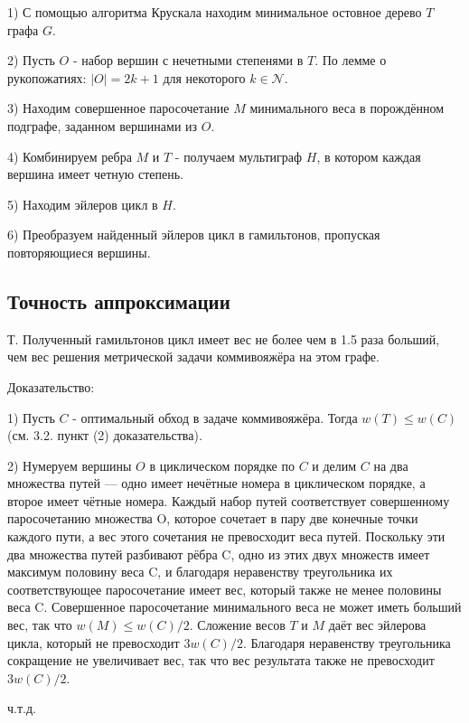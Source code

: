 \documentclass[a4paper,12pt]{article}
\begin{document}
1) С помощью алгоритма Крускала находим минимальное остовное дерево $T$ графа $G$.

2) Пусть $O$ - набор вершин с нечетными степенями в $T$. По лемме о рукопожатиях: $|O| = 2k + 1$ для некоторого $k \in \mathscr{N}$.

3) Находим совершенное паросочетание $M$ минимального веса в порождённом подграфе, заданном вершинами из $O$.

4) Комбинируем ребра $M$ и $T$ - получаем мультиграф $H$, в котором каждая вершина имеет четную степень.

5) Находим эйлеров цикл в $H$.

6) Преобразуем найденный эйлеров цикл в гамильтонов, пропуская повторяющиеся вершины.

\subsection{Точность аппроксимации}

Т. Полученный гамильтонов цикл имеет вес не более чем в 1.5 раза больший, чем вес решения метрической задачи коммивояжёра на этом графе.

Доказательство: 

1) Пусть $C$ - оптимальный обход в задаче коммивояжёра. Тогда $w(T) \leq w(C)$ (см. 3.2. пункт (2) доказательства).

2) Нумеруем вершины $O$ в циклическом порядке по $C$ и делим  $C$ на два множества путей — одно имеет нечётные номера в циклическом порядке, а второе имеет чётные номера. Каждый набор путей соответствует совершенному паросочетанию множества O, которое сочетает в пару две конечные точки каждого пути, а вес этого сочетания не превосходит веса путей. Поскольку эти два множества путей разбивают рёбра C, одно из этих двух множеств имеет максимум половину веса C, и благодаря неравенству треугольника их соответствующее паросочетание имеет вес, который также не менее половины веса C. Совершенное паросочетание минимального веса не может иметь больший вес, так что $w(M) \leq w(C)/2$. Сложение весов $T$ и $M$ даёт вес эйлерова цикла, который не превосходит $3w(C)/2$. Благодаря неравенству треугольника сокращение не увеличивает вес, так что вес результата также не превосходит $3w(C)/2$.

ч.т.д.
\end{document}
